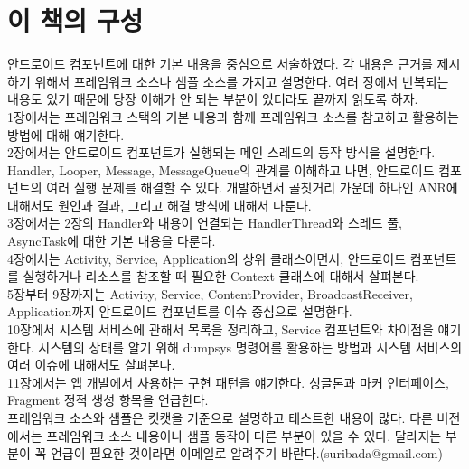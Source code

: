 \documentclass[a4paper,hidelinks,10pt,openany]{book} %
\begin{document}
\chapter*{이 책의 구성}
안드로이드 컴포넌트에 대한 기본 내용을 중심으로 서술하였다. 각 내용은 근거를 제시하기 위해서 프레임워크 소스나 샘플 소스를 가지고 설명한다.
여러 장에서 반복되는 내용도 있기 때문에 당장 이해가 안 되는 부분이 있더라도 끝까지 읽도록 하자.\\

1장에서는 프레임워크 스택의 기본 내용과 함께 프레임워크 소스를 참고하고 활용하는 방법에 대해 얘기한다.\\

2장에서는 안드로이드 컴포넌트가 실행되는 메인 스레드의 동작 방식을 설명한다.
Handler, Looper, Message, MessageQueue의 관계를 이해하고 나면, 안드로이드 컴포넌트의 여러 실행 문제를 해결할 수 있다. 
개발하면서 골칫거리 가운데 하나인 ANR에 대해서도 원인과 결과, 그리고 해결 방식에 대해서 다룬다.\\

3장에서는 2장의 Handler와 내용이 연결되는 HandlerThread와 스레드 풀, AsyncTask에 대한 기본 내용을 다룬다.\\

4장에서는 Activity, Service, Application의 상위 클래스이면서, 안드로이드 컴포넌트를 실행하거나 리소스를 참조할 때 필요한 Context 클래스에 대해서 살펴본다.\\

5장부터 9장까지는 Activity, Service, ContentProvider, BroadcastReceiver, Application까지 안드로이드 컴포넌트를 이슈 중심으로 설명한다.\\

10장에서 시스템 서비스에 관해서 목록을 정리하고, Service 컴포넌트와 차이점을 얘기한다. 시스템의 상태를 알기 위해 dumpsys 명령어를 활용하는 방법과 시스템 서비스의 여러 이슈에 대해서도 살펴본다.\\

11장에서는 앱 개발에서 사용하는 구현 패턴을 얘기한다. 싱글톤과 마커 인터페이스, Fragment 정적 생성 항목을 언급한다.\\

프레임워크 소스와 샘플은 킷캣을 기준으로 설명하고 테스트한 내용이 많다. 다른 버전에서는 프레임워크 소스 내용이나 샘플 동작이 다른 부분이 있을 수 있다. 달라지는 부분이 꼭 언급이 필요한 것이라면 이메일로 알려주기 바란다.(suribada@gmail.com)




\end{document}
